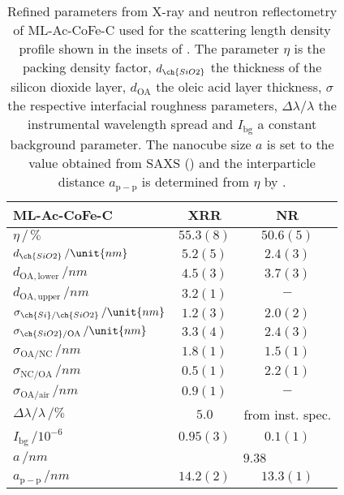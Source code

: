 \documentclass[\main/dresen_thesis.tex]{subfiles}
\begin{document}
  \begin{table}[!htbp]
    \centering
    \caption{\label{tab:monolayers:structure:ML-Ac-CoFe-C-WithSpacer}Refined parameters from X-ray and neutron reflectometry of ML-Ac-CoFe-C used for the scattering length density profile shown in the insets of . The parameter $\eta$ is the packing density factor, $d_{\ch{SiO2}}$ the thickness of the silicon dioxide layer, $d_{\mathrm{OA}}$ the oleic acid layer thickness, $\sigma$ the respective interfacial roughness parameters, $\Delta \lambda / \lambda$ the instrumental wavelength spread and $I_\mathrm{bg}$ a constant background parameter. The nanocube size $a$ is set to the value obtained from SAXS () and the interparticle distance $a_\mathrm{p-p}$ is determined from $\eta$ by .}
    \begin{tabular}{l | c | c}
      \hline
      ML-Ac-CoFe-C & \textbf{XRR} & \textbf{NR}\\
      \hline
      $\eta \, /\, \%$                               & $55.3(8)$  & $50.6(5)$  \\
      $d_{\ch{SiO2}} \, / \unit{nm}$                 & $5.2(5)$   & $2.4(3)$  \\
      $d_{\mathrm{OA, lower}} \, / \unit{nm}$        & $4.5(3)$   & $3.7(3)$  \\
      $d_{\mathrm{OA, upper}} \, / \unit{nm}$        & $3.2(1)$   & $-$  \\
      $\sigma_{\ch{Si}/\ch{SiO2}} \, / \unit{nm}$    & $1.2(3)$   & $2.0(2)$  \\
      $\sigma_{\ch{SiO2}/\mathrm{OA}}\, / \unit{nm}$ & $3.3(4)$   & $2.4(3)$  \\
      $\sigma_\mathrm{OA/NC} \, / \unit{nm}$         & $1.8(1)$   & $1.5(1)$  \\
      $\sigma_\mathrm{NC/OA} \, / \unit{nm}$         & $0.5(1)$   & $2.2(1)$  \\
      $\sigma_\mathrm{OA/air} \, / \unit{nm}$        & $0.9(1)$   & $-$  \\
      $\Delta \lambda / \lambda \, / \unit{\%}$      & $5.0 $     & from inst. spec.\\
      $I_\mathrm{bg}\,/\unit{10^{-6}}$               & $0.95(3)$  & $0.1(1)$\\
      \hline
      $a \, / \unit{nm}$                             & \multicolumn{2}{c}{$9.38$} \\
      \hline
      $a_\mathrm{p-p} \, / \unit{nm}$                & $14.2(2)$     & $13.3(1)$ \\
      \hline
    \end{tabular}
  \end{table}
\end{document}
